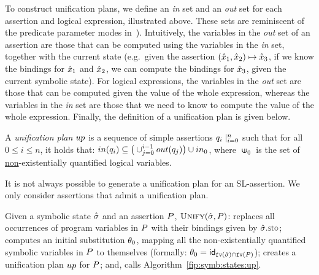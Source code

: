 To construct unification plans, we define an \emph{in} set and an \emph{out} set for each assertion and logical expression, illustrated above. These 
sets are reminiscent of the predicate parameter modes in~\cite{nguyen:vmcai:2008}).
Intuitively, the variables in the \emph{out} set of an assertion are those that can be computed 
using the variables in the \emph{in} set, together with the current state (e.g.~given the assertion $(\hat{x}_1, \hat{x}_2) \mapsto \hat{x}_3$, if we know the bindings
for $\hat{x}_1$ and $\hat{x}_2$, we can compute the bindings for $\hat{x}_3$, given 
the current symbolic state). 
%
For logical expressions, the variables in the \emph{out} set are those that can be computed
given the value of the whole expression, whereas the variables in the \emph{in} set 
are those that we need to know to compute the value of the whole expression.  
Finally, the definition of a unification plan is given below. 

\begin{definition}\label{def:up}
A \emph{unification plan} $up$ is a sequence of simple assertions $q_i \mid_{i=0}^n$ such that
for all $0 \leq i \leq n$, it holds that:
$
 in(q_i) \subseteq \big(\cup_{j = 0}^{i-1} out(q_j)\big) \cup in_0
$,
where $\upin_0$ is the set of \underline{non}-existentially quantified logical variables. 
\end{definition}

\vspace{-3pt}
\noindent It is not always possible to generate a unification plan for an SL-assertion. We only 
consider assertions that admit a unification plan. 


Given a symbolic state $\hat{\sigma}$ and an assertion $P$, $\textsc{Unify}(\hat{\sigma}, P)$: 
 replaces all occurrences of program variables in $P$ with their bindings 
given by $\sstate.\stosel$;
 computes an initial substitution $\theta_0$, mapping all the non-existentially quantified symbolic 
variables in $P$ to themselves (formally: $\theta_0 = {\sf id}_{\texttt{fv}(\hat{\sigma}) \cap \texttt{fv}(P)}$); 
 creates a unification plan $up$ for $P$; and, 
 calls Algorithm~\ref{fip:symb:states:up}. 

